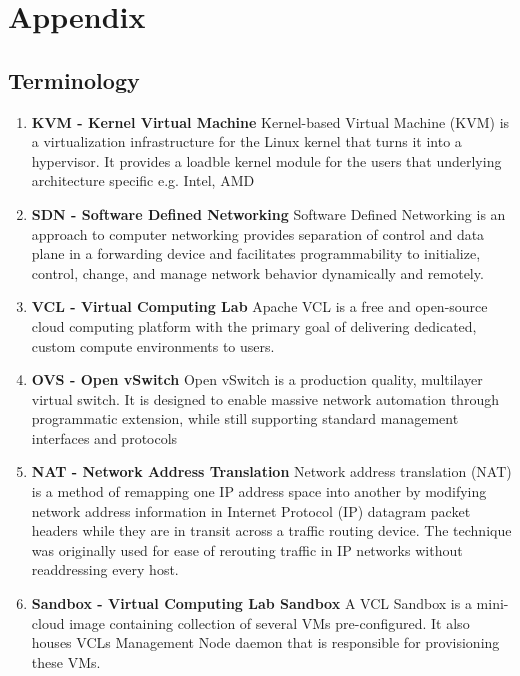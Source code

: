\documentclass[12pt]{extarticle}
\begin{document}



\section{Appendix}
\subsection{Terminology}
\begin{enumerate}
    \item \textbf{KVM - Kernel Virtual Machine}
     \newline
    Kernel-based Virtual Machine (KVM) is a virtualization infrastructure for the Linux kernel that turns it into a hypervisor. It provides a loadble kernel module for the users that underlying architecture specific e.g. Intel, AMD
    
    \item \textbf{SDN - Software Defined Networking}
    \newline
    Software Defined Networking is an approach to computer networking provides separation of control and data plane in a forwarding device and facilitates programmability to initialize, control, change, and manage network behavior dynamically and remotely.
    
    \item \textbf{VCL - Virtual Computing Lab}
    \newline
    Apache VCL is a free and open-source cloud computing platform with the primary goal of delivering dedicated, custom compute environments to users.
    
    \item \textbf{OVS - Open vSwitch}
    \newline
    Open vSwitch is a production quality, multilayer virtual switch. It is designed to enable massive network automation through programmatic extension, while still supporting standard management interfaces and protocols
    
    \item \textbf{NAT - Network Address Translation}
    \newline
    Network address translation (NAT) is a method of remapping one IP address space into another by modifying network address information in Internet Protocol (IP) datagram packet headers while they are in transit across a traffic routing device. The technique was originally used for ease of rerouting traffic in IP networks without readdressing every host.
    
    \item \textbf{Sandbox - Virtual Computing Lab Sandbox}
    \newline
    A VCL Sandbox is a mini-cloud image containing collection of several VMs pre-configured. It also houses VCL\textquotesingle s Management Node daemon that is responsible for provisioning these VMs.  
    
\end{enumerate}
\pagebreak
\end{document}
